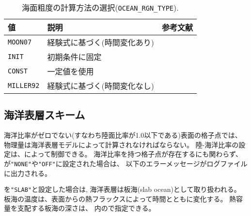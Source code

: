 \begin{table}[h]
\begin{center}
  \caption{海面粗度の計算方法の選択(\texttt{OCEAN\_RGN\_TYPE}).}
  \label{tab:nml_ocean_rgn}
  \begin{tabularx}{150mm}{llX} \hline
    \rowcolor[gray]{0.9}  値 & 説明 & 参考文献 \\ \hline
      \verb|MOON07|   & 経験式に基づく(時間変化あり)   & \citet{moon_2007} \\
      \verb|INIT|     & 初期条件に固定 \\
      \verb|CONST|    & 一定値を使用 \\
      \verb|MILLER92| & 経験式に基づく(時間変化なし) & \citet{miller_1992} \\
    \hline
  \end{tabularx}
\end{center}
\end{table}

\clearpage
\subsection{海洋表層スキーム}

海洋比率がゼロでない(すなわち陸面比率が1.0以下である)表面の格子点では、
物理量は海洋表層モデルによって計算されなければならない。
陸-海洋比率の設定は、によって制御できる。
海洋比率を持つ格子点が存在するにも関わらず、
が\verb|"NONE"|や\verb|"OFF"|に設定された場合は、
以下のエラーメッセージがログファイルに出力される。

を\verb|"SLAB"|と設定した場合は, 海洋表層は板海(slab ocean)として取り扱われる。
板海の温度は、表面からの熱フラックスによって時間とともに変化する。
熱容量を支配する板海の深さは、 内ので指定できる。



